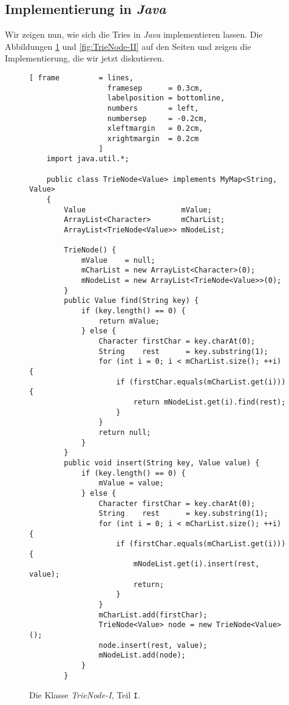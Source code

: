 \subsection{Implementierung in \textsl{Java}}
Wir zeigen nun, wie sich die Tries in \textsl{Java} implementieren lassen.
Die Abbildungen \ref{fig:TrieNode-I} und \ref{fig:TrieNode-II} auf den Seiten
\pageref{fig:TrieNode-I} und 
\pageref{fig:TrieNode-II} zeigen die Implementierung, die wir jetzt diskutieren.

\begin{figure}[!ht]
  \centering
\begin{Verbatim}[ frame         = lines, 
                  framesep      = 0.3cm, 
                  labelposition = bottomline,
                  numbers       = left,
                  numbersep     = -0.2cm,
                  xleftmargin   = 0.2cm,
                  xrightmargin  = 0.2cm
                ]
    import java.util.*;
    
    public class TrieNode<Value> implements MyMap<String, Value>
    {
        Value                      mValue;
        ArrayList<Character>       mCharList;
        ArrayList<TrieNode<Value>> mNodeList;
    
        TrieNode() {
            mValue    = null;
            mCharList = new ArrayList<Character>(0);
            mNodeList = new ArrayList<TrieNode<Value>>(0);
        }    
        public Value find(String key) {
            if (key.length() == 0) {
                return mValue;
            } else {
                Character firstChar = key.charAt(0);
                String    rest      = key.substring(1);
                for (int i = 0; i < mCharList.size(); ++i) {
                    if (firstChar.equals(mCharList.get(i))) {
                        return mNodeList.get(i).find(rest);
                    }
                }
                return null;
            }
        }
        public void insert(String key, Value value) {
            if (key.length() == 0) {
                mValue = value;
            } else {
                Character firstChar = key.charAt(0);
                String    rest      = key.substring(1);
                for (int i = 0; i < mCharList.size(); ++i) {
                    if (firstChar.equals(mCharList.get(i))) {
                        mNodeList.get(i).insert(rest, value);
                        return;
                    }
                }
                mCharList.add(firstChar);
                TrieNode<Value> node = new TrieNode<Value>();
                node.insert(rest, value);
                mNodeList.add(node);
            }
        }
\end{Verbatim}
\vspace*{-0.3cm}
  \caption{Die Klasse \textsl{TrieNode-I}, Teil \texttt{I}.}
  \label{fig:TrieNode-I}
\end{figure}

